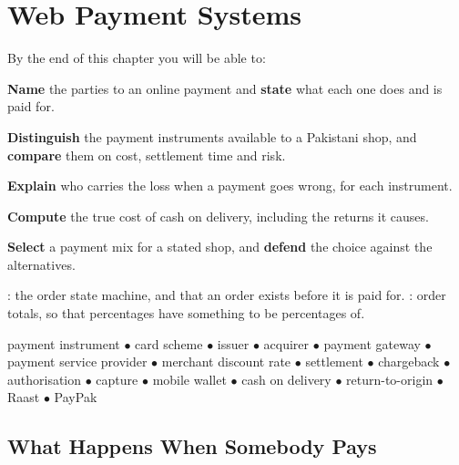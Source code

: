 \chapter{Web Payment Systems}\label{ch:payments}

\begin{outcomes}
By the end of this chapter you will be able to:
\begin{tight}
  \item \textbf{Name} the parties to an online payment and \textbf{state} what
        each one does and is paid for.
  \item \textbf{Distinguish} the payment instruments available to a Pakistani
        shop, and \textbf{compare} them on cost, settlement time and risk.
  \item \textbf{Explain} who carries the loss when a payment goes wrong, for
        each instrument.
  \item \textbf{Compute} the true cost of cash on delivery, including the
        returns it causes.
  \item \textbf{Select} a payment mix for a stated shop, and \textbf{defend}
        the choice against the alternatives.
\end{tight}
\end{outcomes}

\begin{prereq}
: the order state machine, and that an order exists before it
is paid for. : order totals, so that percentages have something
to be percentages of.
\end{prereq}

\begin{keyterms}
payment instrument $\bullet$ card scheme $\bullet$ issuer $\bullet$ acquirer
$\bullet$ payment gateway $\bullet$ payment service provider $\bullet$ merchant
discount rate $\bullet$ settlement $\bullet$ chargeback $\bullet$ authorisation
$\bullet$ capture $\bullet$ mobile wallet $\bullet$ cash on delivery $\bullet$
return-to-origin $\bullet$ Raast $\bullet$ PayPak
\end{keyterms}

\section{What Happens When Somebody Pays}

